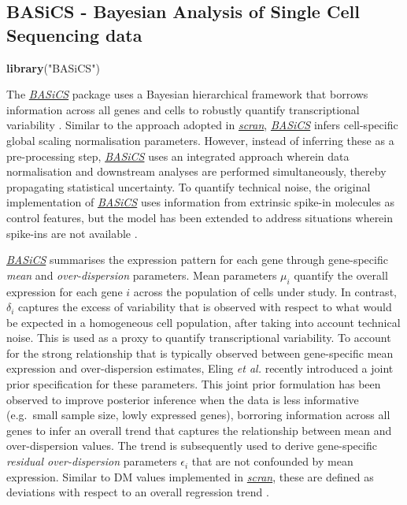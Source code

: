 \documentclass[9pt,a4paper,]{extarticle}
\newenvironment{Shaded}{\begin{snugshade}}{\end{snugshade}}
\newcommand{\KeywordTok}[1]{\textcolor[rgb]{0.13,0.29,0.53}{\textbf{#1}}}
\newcommand{\NormalTok}[1]{#1}
\newcommand{\StringTok}[1]{\textcolor[rgb]{0.31,0.60,0.02}{#1}}
\begin{document}
\hypertarget{basics---bayesian-analysis-of-single-cell-sequencing-data}{%
\subsection{BASiCS - Bayesian Analysis of Single Cell Sequencing data}\label{basics---bayesian-analysis-of-single-cell-sequencing-data}}

\begin{Shaded}
\begin{Highlighting}[]
\KeywordTok{library}\NormalTok{(}\StringTok{"BASiCS"}\NormalTok{)}
\end{Highlighting}
\end{Shaded}

The \emph{\href{https://bioconductor.org/packages/3.11/BASiCS}{BASiCS}} package uses a Bayesian hierarchical framework
that borrows information across all genes and cells to robustly quantify
transcriptional variability \citep{Vallejos2015BASiCS}.
Similar to the approach adopted in \emph{\href{https://bioconductor.org/packages/3.11/scran}{scran}}, \emph{\href{https://bioconductor.org/packages/3.11/BASiCS}{BASiCS}}
infers cell-specific global scaling normalisation parameters.
However, instead of inferring these as a pre-processing step,
\emph{\href{https://bioconductor.org/packages/3.11/BASiCS}{BASiCS}} uses an integrated approach wherein data normalisation
and downstream analyses are performed simultaneously, thereby propagating
statistical uncertainty.
To quantify technical noise, the original implementation of
\emph{\href{https://bioconductor.org/packages/3.11/BASiCS}{BASiCS}} uses information from extrinsic spike-in molecules as
control features, but the model has been extended to address situations wherein
spike-ins are not available \citep{Eling2018}.

\emph{\href{https://bioconductor.org/packages/3.11/BASiCS}{BASiCS}} summarises the expression pattern for each gene through
gene-specific \emph{mean} and \emph{over-dispersion} parameters.
Mean parameters \(\mu_i\) quantify the overall expression for each gene \(i\)
across the population of cells under study.
In contrast, \(\delta_i\) captures the excess of variability that is observed with
respect to what would be expected in a homogeneous cell population, after
taking into account technical noise.
This is used as a proxy to quantify transcriptional variability.
To account for the strong relationship that is typically observed
between gene-specific mean expression and over-dispersion estimates,
Eling \emph{et al.} \citep{Eling2018} recently introduced a joint prior specification for
these parameters.
This joint prior formulation has been observed to improve posterior inference
when the data is less informative (e.g.~small sample size, lowly expressed
genes), borroring information across all genes to infer an overall trend that
captures the relationship between mean and over-dispersion values.
The trend is subsequently used to derive gene-specific \emph{residual over-dispersion}
parameters \(\epsilon_i\) that are not confounded by mean expression.
Similar to DM values implemented in \emph{\href{https://bioconductor.org/packages/3.11/scran}{scran}}, these are defined as
deviations with respect to an overall regression trend .
\end{document}

